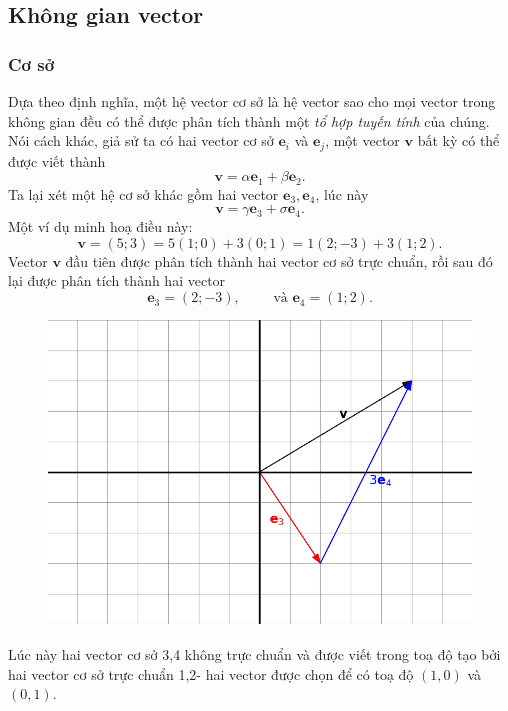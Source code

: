\subsection{Không gian vector}
\subsubsection*{Cơ sở}
Dựa theo định nghĩa, một hệ vector cơ sở là hệ vector sao cho mọi vector trong không gian đều có thể được phân tích thành một \emph{tổ hợp tuyến tính} của chúng. Nói cách khác, giả sử ta có hai vector cơ sở \(\mathbf{e}_i\) và \(\mathbf{e}_j\), một vector \(\mathbf{v}\) bất kỳ có thể được viết thành \[\mathbf{v}=\alpha\mathbf{e}_1 +\beta\mathbf{e}_2.\] Ta lại xét một hệ cơ sở khác gồm hai vector \(\mathbf{e}_{3}, \mathbf{e}_4\), lúc này \[\mathbf{v}=\gamma\mathbf{e}_3 +\sigma\mathbf{e}_4.\]
Một ví dụ  minh hoạ điều này:
\[\mathbf{v}= (5;3)=5(1;0)+3(0;1)=1(2;-3)
+3(1;2).\] Vector \(\mathbf{v}\) đầu tiên được phân tích thành hai vector cơ sở trực chuẩn, rồi sau đó lại được phân tích thành hai vector \[
\mathbf{e}_3 =(2;-3),\qquad \text{ và } \mathbf{e}_4 =(1;2).\] 
\begin{figure}[H]
    \centering
    \includegraphics[width=0.8\linewidth]{Tuan2/Figures/e3e4.png}
\end{figure}
Lúc này hai vector cơ sở 3,4 không trực chuẩn và được viết trong toạ độ tạo bởi hai vector cơ sở trực chuẩn 1,2- hai vector được chọn để có toạ độ \((1,0)\) và \((0,1)\).

